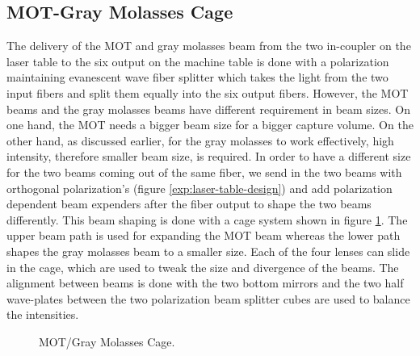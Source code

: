 \subsection{MOT-Gray Molasses Cage}\label{exp:mot-cage}
The delivery of the MOT and gray molasses beam from the two in-coupler on the laser table to the six output on the machine table is done with a polarization maintaining evanescent wave fiber splitter which takes the light from the two input fibers and split them equally into the six output fibers. However, the MOT beams and the gray molasses beams have different requirement in beam sizes. On one hand, the MOT needs a bigger beam size for a bigger capture volume. On the other hand, as discussed earlier, for the gray molasses to work effectively, high intensity, therefore smaller beam size, is required. In order to have a different size for the two beams coming out of the same fiber, we send in the two beams with orthogonal polarization's (figure \ref{exp:laser-table-design}) and add polarization dependent beam expenders after the fiber output to shape the two beams differently. This beam shaping is done with a cage system shown in figure \ref{mot-cage-design}. The upper beam path is used for expanding the MOT beam whereas the lower path shapes the gray molasses beam to a smaller size. Each of the four lenses can slide in the cage, which are used to tweak the size and divergence of the beams. The alignment between beams is done with the two bottom mirrors and the two half wave-plates between the two polarization beam splitter cubes are used to balance the intensities.
\begin{figure}
  \begin{center}
  \end{center}
  \caption{MOT/Gray Molasses Cage.}
  \label{mot-cage-design}
\end{figure}

